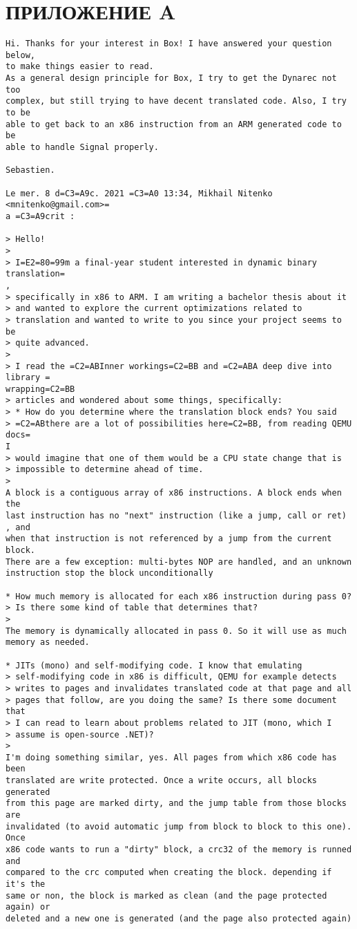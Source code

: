 \section*{ПРИЛОЖЕНИЕ A}

\begin{Verbatim}[fontsize=\footnotesize]
Hi. Thanks for your interest in Box! I have answered your question below,
to make things easier to read.
As a general design principle for Box, I try to get the Dynarec not too
complex, but still trying to have decent translated code. Also, I try to be
able to get back to an x86 instruction from an ARM generated code to be
able to handle Signal properly.

Sebastien.

Le mer. 8 d=C3=A9c. 2021 =C3=A0 13:34, Mikhail Nitenko <mnitenko@gmail.com>=
a =C3=A9crit :

> Hello!
>
> I=E2=80=99m a final-year student interested in dynamic binary translation=
,
> specifically in x86 to ARM. I am writing a bachelor thesis about it
> and wanted to explore the current optimizations related to
> translation and wanted to write to you since your project seems to be
> quite advanced.
>
> I read the =C2=ABInner workings=C2=BB and =C2=ABA deep dive into library =
wrapping=C2=BB
> articles and wondered about some things, specifically:
> * How do you determine where the translation block ends? You said
> =C2=ABthere are a lot of possibilities here=C2=BB, from reading QEMU docs=
I
> would imagine that one of them would be a CPU state change that is
> impossible to determine ahead of time.
>
A block is a contiguous array of x86 instructions. A block ends when the
last instruction has no "next" instruction (like a jump, call or ret) , and
when that instruction is not referenced by a jump from the current block.
There are a few exception: multi-bytes NOP are handled, and an unknown
instruction stop the block unconditionally

* How much memory is allocated for each x86 instruction during pass 0?
> Is there some kind of table that determines that?
>
The memory is dynamically allocated in pass 0. So it will use as much
memory as needed.

* JITs (mono) and self-modifying code. I know that emulating
> self-modifying code in x86 is difficult, QEMU for example detects
> writes to pages and invalidates translated code at that page and all
> pages that follow, are you doing the same? Is there some document that
> I can read to learn about problems related to JIT (mono, which I
> assume is open-source .NET)?
>
I'm doing something similar, yes. All pages from which x86 code has been
translated are write protected. Once a write occurs, all blocks generated
from this page are marked dirty, and the jump table from those blocks are
invalidated (to avoid automatic jump from block to block to this one). Once
x86 code wants to run a "dirty" block, a crc32 of the memory is runned and
compared to the crc computed when creating the block. depending if it's the
same or non, the block is marked as clean (and the page protected again) or
deleted and a new one is generated (and the page also protected again)


\end{Verbatim}
